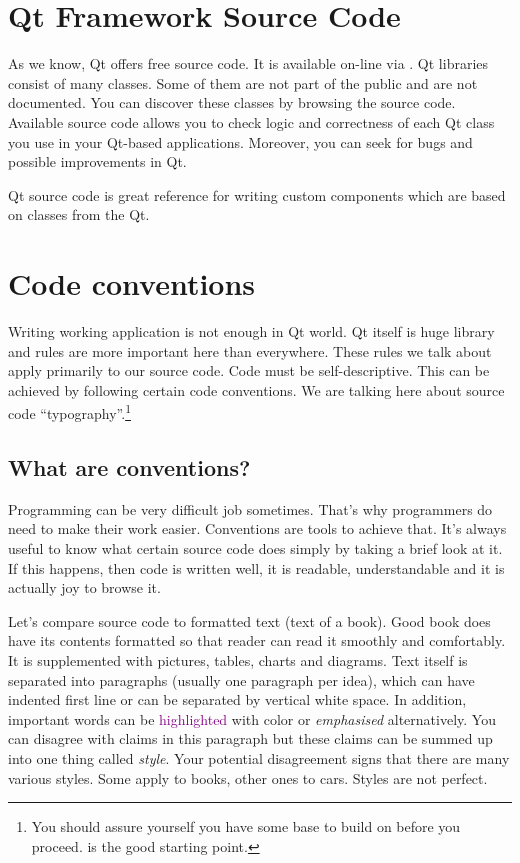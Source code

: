 \section{Qt Framework Source Code}
As we know, Qt offers free source code. It is available on-line via \citep{various:qtgit}. Qt libraries consist of many classes. Some of them are not part of the public  and are not documented. You can discover these classes by browsing the source code. Available source code allows you to check logic and correctness of each Qt class you use in your Qt-based applications. Moreover, you can seek for bugs and possible improvements in Qt.

Qt source code is great reference for writing custom components which are based on classes from the Qt.

\section{Code conventions}
Writing working application is not enough in Qt world. Qt itself is huge library and rules are more important here than everywhere. These rules we talk about apply primarily to our source code. Code must be self-descriptive. This can be achieved by following certain code conventions. We are talking here about source code \enquote{typography}.\footnote{You should assure yourself you have some base to build on before you proceed. \citep[Chap. Layout and Style]{mcconnell:codecomplete} is the good starting point.}

\subsection{What are conventions?}
Programming can be very difficult job sometimes. That's why programmers do need to make their work easier. Conventions are tools to achieve that. It's always useful to know what certain source code does simply by taking a brief look at it. If this happens, then code is written well, it is readable, understandable and it is actually joy to browse it.

Let's compare source code to formatted text (\eg text of a book). Good book does have its contents formatted so that reader can read it smoothly and comfortably. It is supplemented with pictures, tables, charts and diagrams. Text itself is separated into paragraphs (usually one paragraph per idea), which can have indented first line or can be separated by vertical white space. In addition, important words can be \textcolor{purple}{highlighted} with color or \emph{emphasised} alternatively. You can disagree with claims in this paragraph but these claims can be summed up into one thing called \emph{style}. Your potential disagreement signs that there are many various styles. Some apply to books, other ones to cars. Styles are not perfect.

